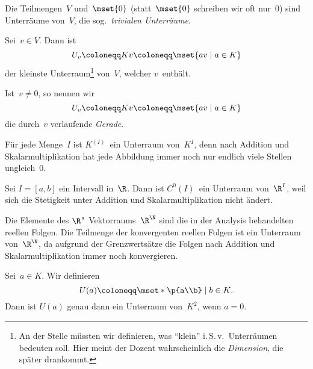 \documentclass[a4paper]{article}
\begin{document}
\begin{example}
    Die Teilmengen~$V$ und~$\mset{0}$ (statt~$\mset{0}$ schreiben wir oft nur~$0$) sind Unterräume von~$V$, die sog.\ \emph{trivialen Unterräume}.
\end{example}

\begin{example}
    Sei~$v \in V$. Dann ist
    \begin{equation*}
        U_v \coloneqq Kv \coloneqq \mset{av \mid a \in K}
    \end{equation*}
    der kleinste Unterraum\footnote{An der Stelle müssten wir definieren, was "`klein"' i.\,S.\,v.\ Unterräumen bedeuten soll. Hier meint der Dozent wahrscheinlich die \emph{Dimension}, die später drankommt.} von~$V$, welcher $v$~enthält.
\end{example}

\begin{definition}[Gerade]
    Ist~$v \neq 0$, so nennen wir
    \begin{equation*}
        U_v \coloneqq Kv \coloneqq \mset{av \mid a \in K}
    \end{equation*}
    die durch~$v$ verlaufende \emph{Gerade}.
\end{definition}

\begin{example}
    Für jede Menge~$I$ ist $K^{(I)}$~ein Unterraum von~$K^I$, denn nach Addition und Skalarmultiplikation hat jede Abbildung immer noch nur endlich viele Stellen ungleich~$0$.
\end{example}

\begin{example}
    Sei $I = [a,b]$ ein Intervall in~$\R$. Dann ist $C^0(I)$~ein Unterraum von~$\R^I$, weil sich die Stetigkeit unter Addition und Skalarmultiplikation nicht ändert.
\end{example}

\begin{example}
    Die Elemente des $\R$"~Vektorraums~$\R^\N$ sind die in der Analysis behandelten reellen Folgen. Die Teilmenge der konvergenten reellen Folgen ist ein Unterraum von~$\R^\N$, da aufgrund der Grenzwertsätze die Folgen nach Addition und Skalarmultiplikation immer noch konvergieren.
\end{example}

\begin{example}
    Sei~$a \in K$. Wir definieren
    \begin{equation*}
        U(a) \coloneqq \mset*{\p{a\\b} \mid b \in K}.
    \end{equation*}
    Dann ist $U(a)$ genau dann ein Unterraum von~$K^2$, wenn $a = 0$.
\end{example}
\end{document}
